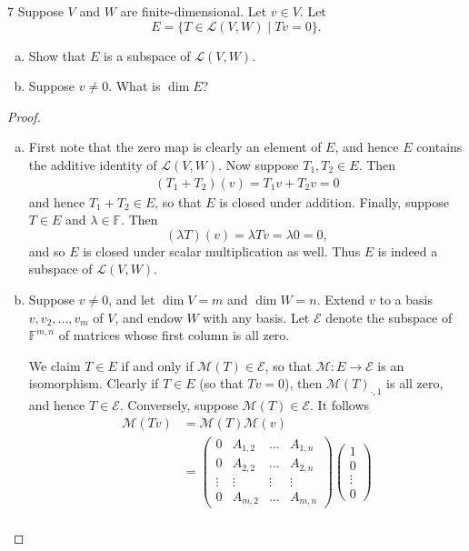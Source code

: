\documentclass{extarticle}
\newenvironment{problem}[1]{\begin{prob*}{#1}{}}{\end{prob*}}
\newcommand{\F}{\mathbb{F}}
\newcommand{\mat}{\mathcal{M}}
\newcommand{\Hom}{\mathcal{L}}
\begin{document}
\begin{problem}{7}
Suppose $V$ and $W$ are finite-dimensional.  Let $v\in V$.  Let 
\begin{equation*}
E = \{T\in \Hom(V,W)\mid Tv = 0\}.
\end{equation*}
\begin{enumerate}[(a)]
\item Show that $E$ is a subspace of $\Hom(V,W)$.
\item Suppose $v\neq 0$.  What is $\dim E$?
\end{enumerate}
\end{problem}
\begin{proof}
\begin{enumerate}[(a)]
\item First note that the zero map is clearly an element of $E$, and hence $E$ contains the additive identity of $\Hom(V,W)$.  Now suppose $T_1,T_2\in E$.  Then 
\begin{align*}
(T_1 + T_2)(v) = T_1v + T_2v = 0
\end{align*}
and hence $T_1 + T_2\in E$, so that $E$ is closed under addition.  Finally, suppose $T\in E$ and $\lambda\in\F$.  Then
\begin{equation*}
(\lambda T)(v) = \lambda Tv = \lambda 0 = 0,
\end{equation*}
and so $E$ is closed under scalar multiplication as well.  Thus $E$ is indeed a subspace of $\Hom(V,W)$.  
\item Suppose $v\neq 0$, and let $\dim V = m$ and $\dim W = n$.   Extend $v$ to a basis $v, v_2, \dots, v_m$ of $V$, and endow $W$ with any basis.  Let $\mathcal{E}$ denote the subspace of $\F^{m,n}$ of matrices whose first column is all zero.  
\par We claim $T\in E$ if and only if $\mat(T)\in \mathcal{E}$, so that $\mat: E\to \mathcal{E}$ is an isomorphism.  Clearly if $T\in E$ (so that $Tv = 0$), then $\mat(T)_{\cdot, 1}$ is all zero, and hence $T\in\mathcal{E}$.  Conversely, suppose $\mat(T)\in \mathcal{E}$.  It follows
\begin{align*}
\mat(Tv) &= \mat(T)\mat(v)\\ 
&= \begin{pmatrix}
0 &A_{1, 2} &\dots &A_{1,n}\\ 
0 &A_{2,2} &\dots &A_{2,n}\\
\vdots &\vdots &\vdots &\vdots\\
0 &A_{m,2} &\dots &A_{m,n}
\end{pmatrix}
\begin{pmatrix}1\\ 0\\ \vdots\\ 0\end{pmatrix}\\

\end{align*}
\end{enumerate}
\end{proof}
\end{document}

